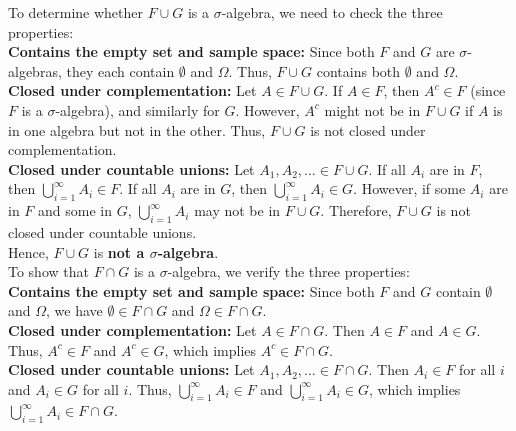 \begin{solution}
    To determine whether \( F \cup G \) is a \(\sigma\)-algebra, we need to check the three properties:\\

    \textbf{Contains the empty set and sample space:} Since both \( F \) and \( G \) are \(\sigma\)-algebras, they each contain \( \emptyset \) and \( \Omega \). Thus, \( F \cup G \) contains both \( \emptyset \) and \( \Omega \).\\
        
    \textbf{Closed under complementation:} Let \( A \in F \cup G \). If \( A \in F \), then \( A^c \in F \) (since \( F \) is a \(\sigma\)-algebra), and similarly for \( G \). However, \( A^c \) might not be in \( F \cup G \) if \( A \) is in one algebra but not in the other. Thus, \( F \cup G \) is not closed under complementation.\\
    
    \textbf{Closed under countable unions:} Let \( A_1, A_2, \ldots \in F \cup G \). If all \( A_i \) are in \( F \), then \( \bigcup_{i=1}^\infty A_i \in F \). If all \( A_i \) are in \( G \), then \( \bigcup_{i=1}^\infty A_i \in G \). However, if some \( A_i \) are in \( F \) and some in \( G \), \( \bigcup_{i=1}^\infty A_i \) may not be in \( F \cup G \). Therefore, \( F \cup G \) is not closed under countable unions.\\
    
    Hence, \( F \cup G \) is \textbf{not a \(\sigma\)-algebra}.\\
    
    To show that \( F \cap G \) is a \(\sigma\)-algebra, we verify the three properties:\\
    
    \textbf{Contains the empty set and sample space:} Since both \( F \) and \( G \) contain \( \emptyset \) and \( \Omega \), we have \( \emptyset \in F \cap G \) and \( \Omega \in F \cap G \).\\
        
    \textbf{Closed under complementation:} Let \( A \in F \cap G \). Then \( A \in F \) and \( A \in G \). Thus, \( A^c \in F \) and \( A^c \in G \), which implies \( A^c \in F \cap G \).\\
        
    \textbf{Closed under countable unions:} Let \( A_1, A_2, \ldots \in F \cap G \). Then \( A_i \in F \) for all \( i \) and \( A_i \in G \) for all \( i \). Thus, \( \bigcup_{i=1}^\infty A_i \in F \) and \( \bigcup_{i=1}^\infty A_i \in G \), which implies \( \bigcup_{i=1}^\infty A_i \in F \cap G \).\\
    

\end{solution}
